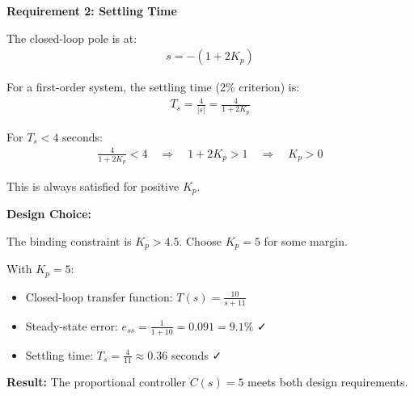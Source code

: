 \documentclass[11pt,a4paper]{article}
\begin{document}
\textbf{Requirement 2: Settling Time}

The closed-loop pole is at:
\begin{align}
  s = -(1 + 2K_p)
\end{align}

For a first-order system, the settling time (2\% criterion) is:
\begin{align}
  T_s = \frac{4}{|s|} = \frac{4}{1 + 2K_p}
\end{align}

For $T_s < 4$ seconds:
\begin{align}
  \frac{4}{1 + 2K_p} < 4 \quad \Rightarrow \quad 1 + 2K_p > 1 \quad \Rightarrow \quad K_p > 0
\end{align}

This is always satisfied for positive $K_p$.

\textbf{Design Choice:}

The binding constraint is $K_p > 4.5$. Choose $K_p = 5$ for some margin.

With $K_p = 5$:
\begin{itemize}
  \item Closed-loop transfer function: $T(s) = \frac{10}{s+11}$
  \item Steady-state error: $e_{ss} = \frac{1}{1+10} = 0.091 = 9.1\%$ ✓
  \item Settling time: $T_s = \frac{4}{11} \approx 0.36$ seconds ✓
\end{itemize}

\textbf{Result:} The proportional controller $C(s) = 5$ meets both design requirements.
\end{document}

